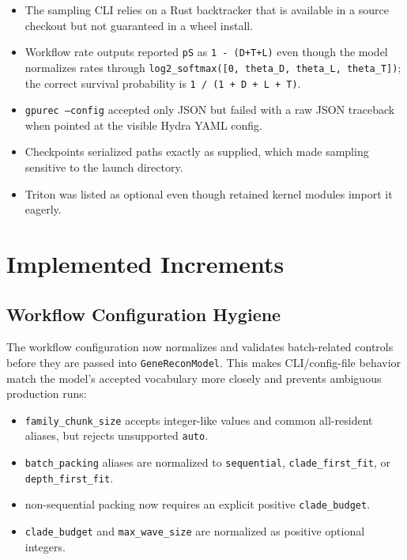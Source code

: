 \documentclass[11pt]{article}
\begin{document}
\begin{itemize}[leftmargin=*]
  \item The sampling CLI relies on a Rust backtracker that is available in a
        source checkout but not guaranteed in a wheel install.
  \item Workflow rate outputs reported \texttt{pS} as
        \texttt{1 - (D+T+L)} even though the model normalizes rates through
        \texttt{log2\_softmax([0, theta\_D, theta\_L, theta\_T])}; the correct
        survival probability is \texttt{1 / (1 + D + L + T)}.
  \item \texttt{gpurec --config} accepted only JSON but failed with a raw JSON
        traceback when pointed at the visible Hydra YAML config.
  \item Checkpoints serialized paths exactly as supplied, which made sampling
        sensitive to the launch directory.
  \item Triton was listed as optional even though retained kernel modules import
        it eagerly.
\end{itemize}

\section{Implemented Increments}

\subsection{Workflow Configuration Hygiene}

The workflow configuration now normalizes and validates batch-related controls
before they are passed into \texttt{GeneReconModel}.  This makes CLI/config-file
behavior match the model's accepted vocabulary more closely and prevents
ambiguous production runs:

\begin{itemize}[leftmargin=*]
  \item \texttt{family\_chunk\_size} accepts integer-like values and common
        all-resident aliases, but rejects unsupported \texttt{auto}.
  \item \texttt{batch\_packing} aliases are normalized to
        \texttt{sequential}, \texttt{clade\_first\_fit}, or
        \texttt{depth\_first\_fit}.
  \item non-sequential packing now requires an explicit positive
        \texttt{clade\_budget}.
  \item \texttt{clade\_budget} and \texttt{max\_wave\_size} are normalized as
        positive optional integers.
\end{itemize}
\end{document}
